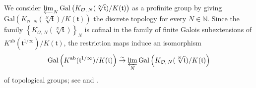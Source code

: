 \documentclass[reqno,11pt]{article}
\theoremstyle{plain} %
\theoremstyle{definition} %
\begin{document}
We consider
$\varprojlim_N\mathrm{Gal}\left(K_{\mathcal{O},\,N}(\sqrt[N]{\mathfrak{t}})/K(\mathfrak{t})\right)$
as a profinite group
by giving $\mathrm{Gal}\left(K_{\mathcal{O},\,N}(\sqrt[N]{\mathfrak{t}})/
K(\mathfrak{t})\right)$ the discrete topology for every $N\in\mathbb{N}$. 
Since the family 
$\left\{K_{\mathcal{O},\,N}(\sqrt[N]{\mathfrak{t}})\right\}_N$
is cofinal in the family of finite Galois subextensions of 
$K^\mathrm{ab}(\mathfrak{t}^{1/\infty})/K(\mathfrak{t})$,
the restriction maps induce an isomorphism
\begin{equation*}
\mathrm{Gal}\left(K^\mathrm{ab}(\mathfrak{t}^{1/\infty})/K(\mathfrak{t})\right)
\stackrel{\sim}{\rightarrow}
\varprojlim_N\mathrm{Gal}\left(K_{\mathcal{O},\,N}(\sqrt[N]{\mathfrak{t}})/K(\mathfrak{t})\right)
\end{equation*}
of topological groups;
see \cite[Chapter 7]{Milne2} and \cite[Lemma 1.1.9 and Theorem 2.11.1]{R-Z}. 
\end{document}
